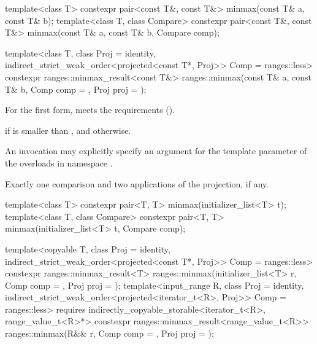 %
\begin{itemdecl}
template<class T>
  constexpr pair<const T&, const T&> minmax(const T& a, const T& b);
template<class T, class Compare>
  constexpr pair<const T&, const T&> minmax(const T& a, const T& b, Compare comp);

template<class T, class Proj = identity,
         indirect_strict_weak_order<projected<const T*, Proj>> Comp = ranges::less>
  constexpr ranges::minmax_result<const T&>
    ranges::minmax(const T& a, const T& b, Comp comp = {}, Proj proj = {});
\end{itemdecl}


\begin{itemdescr}
\pnum
\expects
For the first form,  meets the
 requirements ().

\pnum
\returns
{} if  is smaller than , and
 otherwise.

\pnum
\remarks
An invocation may explicitly specify
an argument for the template parameter 
of the overloads in namespace .

\pnum
\complexity
Exactly one comparison and two applications of the projection, if any.
\end{itemdescr}

%
\begin{itemdecl}
template<class T>
  constexpr pair<T, T> minmax(initializer_list<T> t);
template<class T, class Compare>
  constexpr pair<T, T> minmax(initializer_list<T> t, Compare comp);

template<copyable T, class Proj = identity,
         indirect_strict_weak_order<projected<const T*, Proj>> Comp = ranges::less>
  constexpr ranges::minmax_result<T>
    ranges::minmax(initializer_list<T> r, Comp comp = {}, Proj proj = {});
template<input_range R, class Proj = identity,
         indirect_strict_weak_order<projected<iterator_t<R>, Proj>> Comp = ranges::less>
  requires indirectly_copyable_storable<iterator_t<R>, range_value_t<R>*>
  constexpr ranges::minmax_result<range_value_t<R>>
    ranges::minmax(R&& r, Comp comp = {}, Proj proj = {});
\end{itemdecl}

